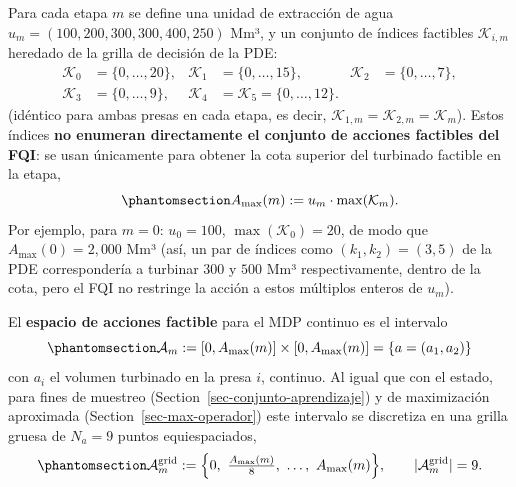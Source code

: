 \documentclass[
  letterpaper,
  DIV=11,
  numbers=noendperiod]{scrreprt}
\theoremstyle{definition}
\theoremstyle{remark}
\begin{document}
Para cada etapa \(m\) se define una unidad de extracción de agua
\(u_m = (100,200,300,300,400,250)\) Mm³, y un conjunto de índices
factibles \(\mathcal K_{i,m}\) heredado de la grilla de decisión de la
PDE: \[
\begin{aligned}
\mathcal{K}_{0} &= \{0,\dots,20\}, &
\mathcal{K}_{1} &= \{0,\dots,15\}, &
\mathcal{K}_{2} &= \{0,\dots,7\}, \\
\mathcal{K}_{3} &= \{0,\dots,9\}, &
\mathcal{K}_{4} &= \mathcal{K}_{5} = \{0,\dots,12\}.
\end{aligned}
\] (idéntico para ambas presas en cada etapa, es decir,
\(\mathcal K_{1,m} = \mathcal K_{2,m} = \mathcal K_{m}\)). Estos índices
\textbf{no enumeran directamente el conjunto de acciones factibles del
FQI}: se usan únicamente para obtener la cota superior del turbinado
factible en la etapa,
\begin{equation}\protect\phantomsection\label{eq-accion-max}{
A_{\max}(m) := u_m \cdot \max(\mathcal K_{m}).
}\end{equation} Por ejemplo, para \(m=0\): \(u_0=100\),
\(\max(\mathcal K_0)=20\), de modo que \(A_{\max}(0)=2{,}000\) Mm³ (así,
un par de índices como \((k_1,k_2)=(3,5)\) de la PDE correspondería a
turbinar \(300\) y \(500\) Mm³ respectivamente, dentro de la cota, pero
el FQI no restringe la acción a estos múltiplos enteros de \(u_m\)).

El \textbf{espacio de acciones factible} para el MDP continuo es el
intervalo
\begin{equation}\protect\phantomsection\label{eq-espacio-acciones}{
\mathcal{A}_m := [0,A_{\max}(m)]\times[0,A_{\max}(m)] = \{a=(a_1,a_2)\}
}\end{equation} con \(a_i\) el volumen turbinado en la presa \(i\),
continuo. Al igual que con el estado, para fines de muestreo
(Section~\ref{sec-conjunto-aprendizaje}) y de maximización aproximada
(Section~\ref{sec-max-operador}) este intervalo se discretiza en una
grilla gruesa de \(N_a=9\) puntos equiespaciados,
\begin{equation}\protect\phantomsection\label{eq-grilla-accion}{
\mathcal A_m^{\text{grid}} := \Big\{0,\ \tfrac{A_{\max}(m)}{8},\ \dots,\ A_{\max}(m)\Big\}, \qquad |\mathcal A_m^{\text{grid}}|=9.
}\end{equation}
\end{document}
